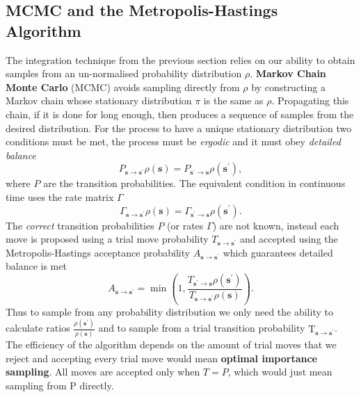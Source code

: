 \subsection{MCMC and the Metropolis-Hastings Algorithm}
\label{subsec:Impl-MCMC}
The integration technique from the previous section relies on our ability to obtain samples from an un-normalised probability distribution $\rho$. \textbf{Markov Chain Monte Carlo} (MCMC) avoids sampling directly from $\rho$ by constructing a Markov chain whose stationary distribution $\pi$ is the same as $\rho$. Propagating this chain, if it is done for long enough, then produces a sequence of samples from the desired distribution. For the process to have a unique stationary distribution two conditions must be met, the process must be \emph{ergodic} and it must obey \emph{detailed balance}
\begin{equation}
	P_{\mathbf{s \rightarrow \mathbf{s}^\prime}}\rho(\mathbf{s}) = P_{\mathbf{s^\prime \rightarrow \mathbf{s}}} \rho(\mathbf{s}^\prime),
\end{equation}
where $P$ are the transition probabilities. The equivalent condition in continuous time uses the rate matrix $\Gamma$
\begin{equation}
	\Gamma_{\mathbf{s \rightarrow \mathbf{s}^\prime}}\rho(\mathbf{s}) = \Gamma_{\mathbf{s^\prime \rightarrow \mathbf{s}}} \rho(\mathbf{s}^\prime).
\end{equation}
The \emph{correct} transition probabilities $P$ (or rates $\Gamma$) are not known, instead each move is proposed using a trial move probability $T_{\mathbf{s \rightarrow \mathbf{s}^\prime}}$ and accepted using the Metropolis-Hastings acceptance probability $A_{\mathbf{s \rightarrow \mathbf{s}^\prime}}$ which guarantees detailed balance is met
\begin{equation}
	A_{\mathbf{s \rightarrow \mathbf{s}^\prime}} = \min \left(1, \frac{T_{\mathbf{s^\prime \rightarrow \mathbf{s}}} \rho(\mathbf{s}^\prime)}{
		T_{\mathbf{s \rightarrow \mathbf{s}^\prime}}\rho(\mathbf{s})}\right).
\end{equation} 
Thus to sample from any probability distribution we only need the ability to calculate ratios $\frac{\rho(\boldsymbol{s}^{\prime})}{\rho(\boldsymbol{s})}$ and to sample from a trial transition probability $\mathrm T_{\mathbf{s \rightarrow \mathbf{s}^\prime}}$. The efficiency of the algorithm depends on the amount of trial moves that we reject and accepting every trial move would mean \textbf{optimal importance sampling}. All moves are accepted only when $T = P$, which would just mean sampling from $\mathrm P$ directly. 

